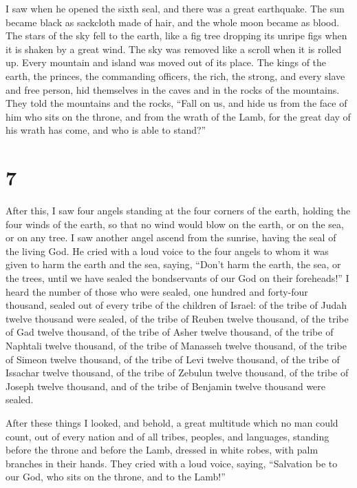  I saw when he opened the sixth seal, and there was a
great earthquake. The sun became black as sackcloth made of hair, and
the whole moon became as blood.  The stars of the sky
fell to the earth, like a fig tree dropping its unripe figs when it is
shaken by a great wind.  The sky was removed like a
scroll when it is rolled up. Every mountain and island was moved out of
its place.  The kings of the earth, the princes, the
commanding officers, the rich, the strong, and every slave and free
person, hid themselves in the caves and in the rocks of the mountains.
 They told the mountains and the rocks, ``Fall on us, and
hide us from the face of him who sits on the throne, and from the wrath
of the Lamb,  for the great day of his wrath has come,
and who is able to stand?''

\hypertarget{section-6}{%
\section{7}\label{section-6}}

 After this, I saw four angels standing at the four
corners of the earth, holding the four winds of the earth, so that no
wind would blow on the earth, or on the sea, or on any tree.
 I saw another angel ascend from the sunrise, having the
seal of the living God. He cried with a loud voice to the four angels to
whom it was given to harm the earth and the sea,  saying,
``Don't harm the earth, the sea, or the trees, until we have sealed the
bondservants of our God on their foreheads!''  I heard the
number of those who were sealed, one hundred and forty-four thousand,
sealed out of every tribe of the children of Israel:  of
the tribe of Judah twelve thousand were sealed, of the tribe of Reuben
twelve thousand, of the tribe of Gad twelve thousand,  of
the tribe of Asher twelve thousand, of the tribe of Naphtali twelve
thousand, of the tribe of Manasseh twelve thousand,  of
the tribe of Simeon twelve thousand, of the tribe of Levi twelve
thousand, of the tribe of Issachar twelve thousand,  of
the tribe of Zebulun twelve thousand, of the tribe of Joseph twelve
thousand, and of the tribe of Benjamin twelve thousand were sealed.

 After these things I looked, and behold, a great
multitude which no man could count, out of every nation and of all
tribes, peoples, and languages, standing before the throne and before
the Lamb, dressed in white robes, with palm branches in their hands.
 They cried with a loud voice, saying, ``Salvation be to
our God, who sits on the throne, and to the Lamb!''

